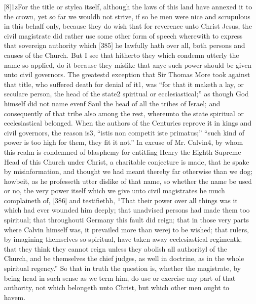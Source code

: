 [8]1zFor the title or stylea itself, although the laws of this land have annexed it to the crown, yet so far we wouldb not strive, if so be men were nice and scrupulous in this behalf only, because they do wish that for reverence unto Christ Jesus, the civil magistrate did rather use some other form of speech wherewith to express that sovereign authority which [385] he lawfully hath over all, both persons and causes of the Church. But I see that hitherto they which condemn utterly the name so applied, do it because they mislike that anyc such power should be given unto civil governors. The greatestd exception that Sir Thomas More took against that title, who suffered death for denial of it1, was “for that it maketh a lay, or seculare person, the head of the state2 spiritual or ecclesiastical;” as though God himself did not name evenf Saul the head of all the tribes of Israel; and consequently of that tribe also among the rest, whereunto the state spiritual or ecclesiastical belonged. When the authors of the Centuries reprove it in kings and civil governors, the reason is3, “istis non competit iste primatus;” “such kind of power is too high for them, they fit it not.” In excuse of Mr. Calvin4, by whom this realm is condemned of blasphemy for entitling Henry the Eighth Supreme Head of this Church under Christ, a charitable conjecture is made, that he spake by misinformation, and thought we had meant thereby far otherwise than we dog; howbeit, as he professeth utter dislike of that name, so whether the name be used or no, the very power itself which we give unto civil magistrates he much complaineth of, [386] and testifiethh, “That their power over all things was it which had ever wounded him deeply; that unadvised persons had made them too spiritual; that throughouti Germany this fault did reign; that in those very parts where Calvin himself was, it prevailed more than werej to be wished; that rulers, by imagining themselves so spiritual, have taken away ecclesiastical regimentk; that they think they cannot reign unless they abolish all authorityl of the Church, and be themselves the chief judges, as well in doctrine, as in the whole spiritual regency.” So that in truth the question is, whether the magistrate, by being head in such sense as we term him, do use or exercise any part of that authority, not which belongeth unto Christ, but which other men ought to havem.

